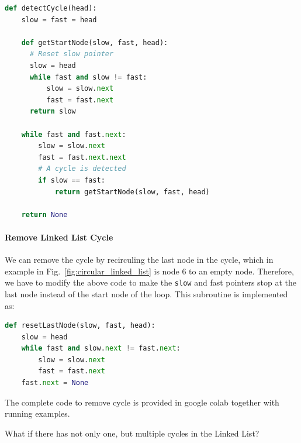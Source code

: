 \documentclass[../main.tex]{subfiles}
\begin{document}


\begin{lstlisting}[language=Python]
def detectCycle(head):
    slow = fast = head

    def getStartNode(slow, fast, head):
      # Reset slow pointer      
      slow = head
      while fast and slow != fast:
          slow = slow.next
          fast = fast.next
      return slow

    while fast and fast.next:
        slow = slow.next
        fast = fast.next.next
        # A cycle is detected
        if slow == fast: 
            return getStartNode(slow, fast, head)
    
    return None
\end{lstlisting}

\paragraph{Remove Linked List Cycle}
We can remove the cycle by recirculing the last node in the cycle, which in example in Fig.~\ref{fig:circular_linked_list} is node 6 to an empty node. Therefore, we have to modify the above code to make the \texttt{slow} and {fast} pointers stop at the last node instead of the start node of the loop. This subroutine is implemented as:
\begin{lstlisting}[language=Python]
def resetLastNode(slow, fast, head):
    slow = head
    while fast and slow.next != fast.next:
        slow = slow.next
        fast = fast.next
    fast.next = None
\end{lstlisting}
The complete code to remove cycle is provided in google colab together with running examples.
\begin{bclogo}[couleur = blue!30, arrondi=0.1,logo=\bccrayon,ombre=true]{What if there has not only one, but multiple cycles in the Linked List? } 
\end{bclogo}
\end{document}
